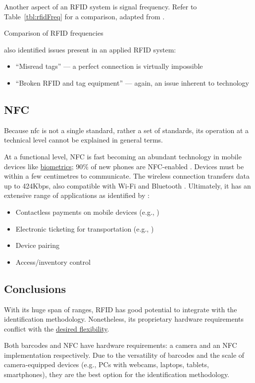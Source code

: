 Another aspect of an RFID system is signal frequency.
Refer to Table~\ref{tbl:rfidFreq} for a comparison, adapted
from \cite{whatIsRfid}.

\begin{table}[h]
  \centering
  \small
  
  \caption{Comparison of RFID frequencies}
  \label{tbl:rfidFreq}
\end{table}

\cite{barcodeRfidComparison} also identified issues present
in an applied RFID system:

\begin{itemize}

  \item \enquote{Misread tags} --- a perfect
        connection is virtually impossible

  \item \enquote{Broken RFID and tag equipment}
        --- again, an issue inherent to technology

\end{itemize}

\subsection{NFC} \label{ss:nfc}

Because \gls{nfc} is not a single standard, rather a set of
standards, its operation at a technical level cannot be
explained in general terms.

At a functional level, NFC is fast becoming an abundant
technology in mobile devices like
\hyperref[ss:biometrics]{biometrics}; 90\% of new phones
are NFC-enabled \parencite{nfcHandsetStats}.
Devices must be within a few centimetres to communicate.
The wireless connection transfers data up to 424Kbps, also
compatible with Wi-Fi and Bluetooth \parencite{nfc}.
Ultimately, it has an extensive range of applications as
identified by \cite{nfc}: 

\begin{itemize} \item Contactless payments on mobile
        devices (e.g., \cite{androidPayWithPhone, applePay}) \item
        Electronic ticketing for transportation (e.g.,
        \cite{digitalTickets}) \item Device pairing \item
        Access/inventory control \end{itemize} 

\subsection{Conclusions} 

With its huge span of ranges, RFID has good potential to
integrate with the identification methodology.
Nonetheless, its proprietary hardware requirements conflict
with the \hyperref[ss:goal]{desired flexibility}.

Both barcodes and NFC have hardware requirements: a camera
and an NFC implementation respectively.
Due to the versatility of barcodes and the scale of
camera-equipped devices (e.g., PCs with webcams, laptops,
tablets, smartphones), they are the best option for the
identification methodology.
